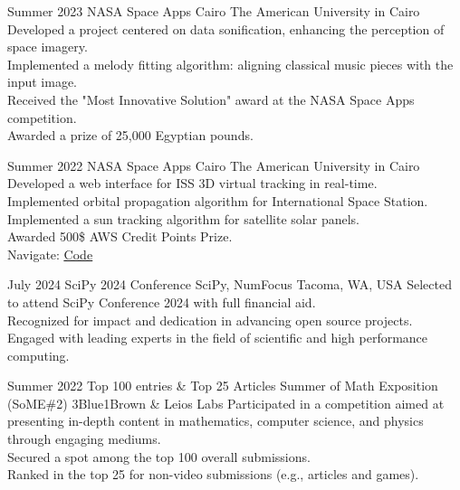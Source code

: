 \documentclass[hidelinks]{report}
\begin{document}
\vspace{4mm}


\entry
    {Summer 2023}
    {NASA Space Apps Cairo}
    {The American University in Cairo }    
    {}
    {
      \textbullet Developed a project centered on data sonification, enhancing the perception of space imagery.\\
      \textbullet Implemented a melody fitting algorithm: aligning classical music pieces with the input image.\\
      \textbullet Received the "Most Innovative Solution" award at the NASA Space Apps competition.\\
      \textbullet Awarded a prize of 25,000 Egyptian pounds.\\
    }
    
\entry 
    {Summer 2022}
    {NASA Space Apps Cairo}
    {The American University in Cairo }
    {}
    { \textbullet Developed a web interface for ISS 3D virtual tracking in real-time. \\
      \textbullet Implemented orbital propagation algorithm for International Space Station.\\ 
      \textbullet Implemented a sun tracking algorithm for satellite solar panels.\\
      \textbullet Awarded 500\$ AWS Credit Points Prize.\\ 
      \textbullet Navigate: \href{\github/Apollo}{\underline{Code}}
    }

\vspace{2mm}


\entry
    {July 2024}
    {SciPy 2024 Conference}  
    {SciPy, NumFocus}
    {Tacoma, WA, USA}
    {
        \textbullet Selected to attend SciPy Conference 2024 with full financial aid.\\
        \textbullet Recognized for impact and dedication in advancing open source projects.\\
        \textbullet Engaged with leading experts in the field of scientific and high performance computing.\\
    }

\entry
    {Summer 2022}
    {Top 100 entries \& Top 25 Articles}
    {Summer of Math Exposition (SoME\#2)}
    {3Blue1Brown \& Leios Labs}  
    {
        \textbullet Participated in a competition aimed at presenting in-depth content in mathematics, computer science, and physics through engaging mediums.\\
        \textbullet Secured a spot among the top 100 overall submissions.\\
        \textbullet Ranked in the top 25 for non-video submissions (e.g., articles and games).\\
    }
\end{document}
